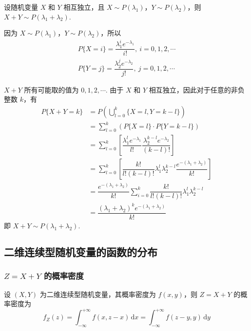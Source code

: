 \begin{conclusion}
    设随机变量 $X$ 和 $Y$ 相互独立，且 $X \sim P(\lambda_1)$，$Y \sim P(\lambda_2)$，则 $X+Y \sim P(\lambda_1 + \lambda_2)$.
\end{conclusion}

\begin{myproof}
    因为 $X \sim P(\lambda_1)$，$Y \sim P(\lambda_2)$，所以
    \begin{gather*}
        P\{X=i\} = \dfrac{\lambda_1^i e^{-\lambda_1}}{i!},\ i=0,1,2,\cdots \\[0.5em]
        P\{Y=j\} = \dfrac{\lambda_2^j e^{-\lambda_2}}{j!},\ j=0,1,2,\cdots
    \end{gather*}

    $X+Y$ 所有可能取的值为 $0,1,2,\cdots$. 由于 $X$ 和 $Y$ 相互独立，因此对于任意的非负整数 $k$，有
    $$
    \begin{aligned}
        P\{X+Y=k\} &= P(\bigcup_{l=0}^k \{X=l, Y=k-l\}) \\
        &= \sum_{l=0}^k (P\{X=l\} \cdot P\{Y=k-l\}) \\
        &= \sum_{l=0}^k \left[ \dfrac{\lambda_1^l e^{-\lambda_1}}{l!} \dfrac{\lambda_2^{k-l} e^{-\lambda_2}}{(k-l)!} \right] \\
        &= \sum_{l=0}^k \left[ \dfrac{k!}{l!(k-l)!} \lambda_1^l \lambda_2^{k-l} \dfrac{e^{-(\lambda_1 + \lambda_2)}}{k!} \right] \\
        &= \dfrac{e^{-(\lambda_1 + \lambda_2)}}{k!} \sum_{i=0}^k \dfrac{k!}{l!(k-l)!} \lambda_1^l \lambda_2^{k-l} \\
        &= \dfrac{(\lambda_1 + \lambda_2)^k e^{-(\lambda_1 + \lambda_2)}}{k!}
    \end{aligned}
    $$
    即 $X+Y \sim P(\lambda_1 + \lambda_2)$.
\end{myproof}

\subsection{二维连续型随机变量的函数的分布}

\subsubsection{$Z=X+Y$ 的概率密度}

\begin{conclusion}
    设 $(X,Y)$ 为二维连续型随机变量，其概率密度为 $f(x,y)$，则 $Z=X+Y$ 的概率密度为
    $$
    f_{Z}(z) = \int_{-\infty}^{+\infty} f(x,z-x) \, \text{d}x = \int_{-\infty}^{+\infty} f(z-y,y) \, \text{d}y
    $$
\end{conclusion}

